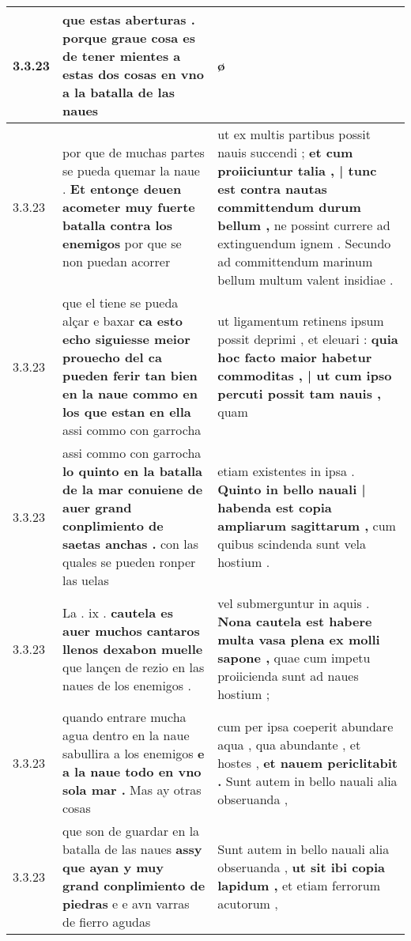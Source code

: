 \begin{tabular}{|p{1cm}|p{6.5cm}|p{6.5cm}|}
3.3.23 & que estas aberturas . \textbf{ porque graue cosa es de tener mientes a estas dos cosas } en vno a la batalla de las naues & ø \\\hline
3.3.23 & por que de muchas partes se pueda quemar la naue . \textbf{ Et entonçe deuen acometer muy fuerte batalla contra los enemigos } por que se non puedan acorrer & ut ex multis partibus possit nauis succendi ; \textbf{ et cum proiiciuntur talia , | tunc est contra nautas committendum durum bellum , } ne possint currere ad extinguendum ignem . Secundo ad committendum marinum bellum multum valent insidiae . \\\hline
3.3.23 & que el tiene se pueda alçar e baxar \textbf{ ca esto echo siguiesse meior prouecho del ca pueden ferir tan bien en la naue commo en los que estan en ella } assi commo con garrocha & ut ligamentum retinens ipsum possit deprimi , et eleuari : \textbf{ quia hoc facto maior habetur commoditas , | ut cum ipso percuti possit tam nauis , } quam \\\hline
3.3.23 & assi commo con garrocha \textbf{ lo quinto en la batalla de la mar conuiene de auer grand conplimiento de saetas anchas . } con las quales se pueden ronper las uelas & etiam existentes in ipsa . \textbf{ Quinto in bello nauali | habenda est copia ampliarum sagittarum , } cum quibus scindenda sunt vela hostium . \\\hline
3.3.23 & La . ix . \textbf{ cautela es auer muchos cantaros llenos dexabon muelle } que lançen de rezio en las naues de los enemigos . & vel submerguntur in aquis . \textbf{ Nona cautela est habere multa vasa plena ex molli sapone , } quae cum impetu proiicienda sunt ad naues hostium ; \\\hline
3.3.23 & quando entrare mucha agua dentro en la naue sabullira a los enemigos \textbf{ e a la naue todo en vno sola mar . } Mas ay otras cosas & cum per ipsa coeperit abundare aqua , qua abundante , et hostes , \textbf{ et nauem periclitabit . } Sunt autem in bello nauali alia obseruanda , \\\hline
3.3.23 & que son de guardar en la batalla de las naues \textbf{ assy que ayan y muy grand conplimiento de piedras } e e avn varras de fierro agudas & Sunt autem in bello nauali alia obseruanda , \textbf{ ut sit ibi copia lapidum , } et etiam ferrorum acutorum , \\\hline

\end{tabular}

